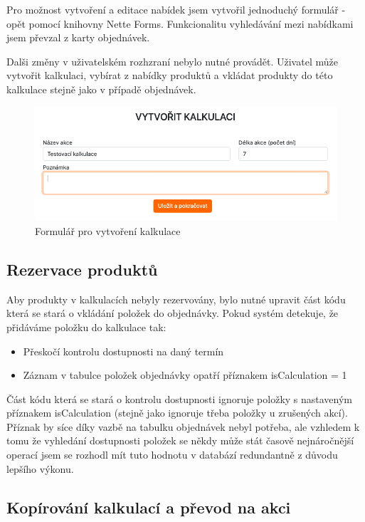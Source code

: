 Pro možnost vytvoření a editace nabídek jsem vytvořil jednoduchý formulář - opět pomocí knihovny Nette Forms. Funkcionalitu vyhledávání mezi nabídkami jsem převzal z karty objednávek.

Dalši změny v uživatelském rozhzraní nebylo nutné provádět. Uživatel může vytvořit kalkulaci, vybírat z nabídky produktů a vkládat produkty do této kalkulace stejně jako v případě objednávek.

\begin{figure}
    \centering
    \includegraphics[width=0.75\linewidth]{kalkulace-formular.png}
    \caption{Formulář pro vytvoření kalkulace}
    \label{fig:enter-label}
\end{figure}

\subsection{Rezervace produktů}

Aby produkty v kalkulacích nebyly rezervovány, bylo nutné upravit část kódu která se stará o vkládání položek do objednávky. Pokud systém detekuje, že přidáváme položku do kalkulace tak:

\begin{itemize}
    \item Přeskočí kontrolu dostupnosti na daný termín
    \item Záznam v tabulce položek objednávky opatří příznakem isCalculation = 1
\end{itemize}

Část kódu která se stará o kontrolu dostupnosti ignoruje položky s nastaveným příznakem isCalculation (stejně jako ignoruje třeba položky u zrušených akcí). Příznak by síce díky vazbě na tabulku objednávek nebyl potřeba, ale vzhledem k tomu že vyhledání dostupnosti položek se někdy může stát časově nejnáročnější operací jsem se rozhodl mít tuto hodnotu v databází redundantně z důvodu lepšího výkonu.

\subsection{Kopírování kalkulací a převod na akci}

